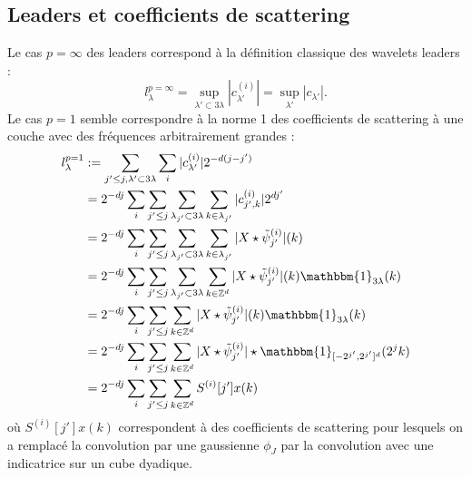 \documentclass[11pt]{article} %
\begin{document}
	\subsection{Leaders et coefficients de scattering}
	Le cas $p=\infty$ des leaders correspond à la définition classique des wavelets leaders :
	\begin{equation}
		l_\lambda^{p=\infty} = \sup_{\lambda'\subset 3\lambda}|c_{\lambda'}^{(i)}| = \sup_{\lambda'} |c_{\lambda'}|.
	\end{equation}
	Le cas $p=1$ semble correspondre à la norme 1 des coefficients de scattering à une couche avec des fréquences arbitrairement grandes :
	\begin{align}
		l_\lambda^{p=1} 	&:= \sum_{j'\leq j, \lambda' \subset 3\lambda} \sum_i |c_{\lambda'}^{(i)}| 2^{-d(j-j')} \\
						&= 2^{-dj}\sum_i \sum_{j' \leq j} \sum_{\lambda_{j'} \subset 3\lambda} \sum_{k\in \lambda_{j'}} |c_{j',k}^{(i)}| 2^{dj'} \\
						&= 2^{-dj}\sum_i \sum_{j' \leq j} \sum_{\lambda_{j'} \subset 3\lambda} \sum_{k\in \lambda_{j'}} |X\star\tilde\psi_{j'}^{(i)}| (k) \\
						&= 2^{-dj}\sum_i \sum_{j' \leq j} \sum_{\lambda_{j'} \subset 3\lambda} \sum_{k\in \mathbb{Z}^d} |X\star\tilde\psi_{j'}^{(i)}| (k) \mathbbm{1}_{3\lambda}(k)\\
						&= 2^{-dj}\sum_i \sum_{j' \leq j} \sum_{k\in \mathbb{Z}^d} |X\star\tilde\psi_{j'}^{(i)}| (k) \mathbbm{1}_{3\lambda}(k)\\
						&= 2^{-dj}\sum_i \sum_{j' \leq j} \sum_{k\in \mathbb{Z}^d} |X\star\tilde\psi_{j'}^{(i)}| \star \mathbbm{1}_{[-2^{j'}, 2^{j'}]^d}(2^j k)\\
						&= 2^{-dj}\sum_i \sum_{j' \leq j} \sum_{k\in \mathbb{Z}^d} S^{(i)}[j']x(k)\\
	\end{align}
	où $S^{(i)}[j']x(k)$ correspondent à des coefficients de scattering pour lesquels on a remplacé la convolution par une gaussienne $\phi_J$ par la convolution avec une indicatrice sur un cube dyadique.
\end{document}
